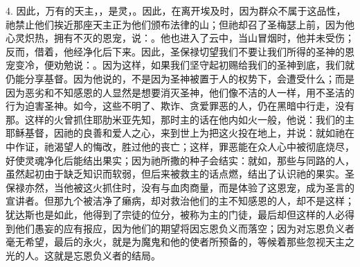 4. 因此，万有的天主，，是灵，。因此，在离开埃及时，因为群众不属于这品性，祂禁止他们挨近那座天主正为他们颁布法律的山；但祂却召了圣梅瑟上前，因为他心灵炽热，拥有不灭的恩宠，说：。他也进入了云中，当山冒烟时，他并未受伤；反而，借着，他经净化后下来。因此，圣保禄切望我们不要让我们所得的圣神的恩宠变冷，便劝勉说：。因为这样，如果我们坚守起初赐给我们的圣神到底，我们就仍能分享基督。因为他说的，不是因为圣神被置于人的权势下，会遭受什么；而是因为恶劣和不知感恩的人显然是想要消灭圣神，他们像不洁的人一样，用不圣洁的行为迫害圣神。如今，这些不明了、欺诈、贪爱罪恶的人，仍在黑暗中行走，没有那。这样的火曾抓住耶肋米亚先知，那时主的话在他内如火一般，他说：我们的主耶稣基督，因祂的良善和爱人之心，来到世上为把这火投在地上，并说：就如祂在中作证，祂渴望人的悔改，胜过他的丧亡；这样，罪恶能在众人心中被彻底烧尽，好使灵魂净化后能结出果实；因为祂所撒的种子会结实：就如，那些与同路的人，虽然起初由于缺乏知识而软弱，但后来被救主的话点燃，结出了认识祂的果实。圣保禄亦然，当他被这火抓住时，没有与血肉商量，而是体验了这恩宠，成为圣言的宣讲者。但那九个被洁净了癞病，却对救治他们的主不知感恩的人，却不是这样；犹达斯也是如此，他得到了宗徒的位分，被称为主的门徒，最后却但这样的人必得到他们愚妄的应有报应，因为他们的期望将因忘恩负义而落空；因为对忘恩负义者毫无希望，最后的永火，就是为魔鬼和他的使者所预备的，等候着那些忽视天主之光的人。这就是忘恩负义者的结局。\par

